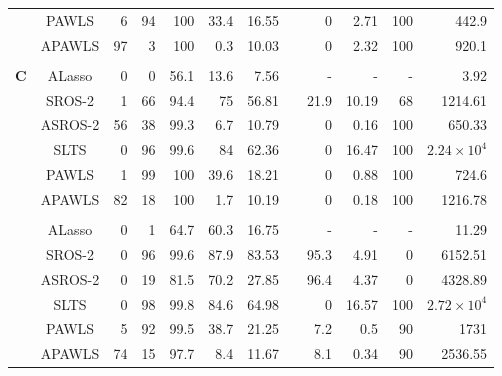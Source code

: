 \documentclass{article}\usepackage[]{graphicx}\usepackage[]{color}
\begin{document}
\begin{table}[thp]
\begin{center}
\begin{tabular}{ccrrrrrrrrrr}
	      & PAWLS & 6 & 94 & 100 
	      & 33.4 & 16.55 & & 0 
	      & 2.71 & 100 & 442.9\\
	      
	      & APAWLS & 97 & 3 & 100 
	      & 0.3 & 10.03 & & 0 
	      & 2.32 & 100 & 920.1\\
	      \\
	        	  \multirow{8}{*}{{\bf C}}
	     	      & ALasso & 0 & 0 & 56.1 
	      & 13.6 & 7.56 & & -& - & - &  3.92\\
	      
	       & SROS-2 & 1 & 66 & 94.4 
	      & 75 & 56.81 & & 21.9 
	      & 10.19 & 68 & 1214.61\\
	      
	      & ASROS-2 & 56 & 38 & 99.3 
	      & 6.7 & 10.79 & & 0 
	      & 0.16 & 100 & 650.33\\
	      
	      
	       & SLTS & 0 & 96 & 99.6 
	      & 84 & 62.36 & & 0 
	      & 16.47 & 100 & \ensuremath{2.24\times 10^{4}}\\
	      
	      & PAWLS & 1 & 99 & 100 
	      & 39.6 & 18.21 & & 0 
	      & 0.88 & 100 & 724.6\\
	      
	      & APAWLS & 82 & 18 & 100 
	      & 1.7 & 10.19 & & 0 
	      & 0.18 & 100 & 1216.78\\
	      
	     \\
	       	  \multirow{8}{*}{{\bf D}}
	     	      & ALasso & 0 & 1 & 64.7 
	      & 60.3 & 16.75 & & -& - & - &  11.29\\
	      
	       & SROS-2 & 0 & 96 & 99.6 
	      & 87.9 & 83.53 & & 95.3 
	      & 4.91 & 0 & 6152.51\\
	      
	      & ASROS-2 & 0 & 19 & 81.5 
	      & 70.2 & 27.85 & & 96.4 
	      & 4.37 & 0 & 4328.89\\
	      
	      
	       & SLTS & 0 & 98 & 99.8 
	      & 84.6 & 64.98 & & 0 
	      & 16.57 & 100 & \ensuremath{2.72\times 10^{4}}\\
	      
	      & PAWLS & 5 & 92 & 99.5 
	      & 38.7 & 21.25 & & 7.2 
	      & 0.5 & 90 & 1731\\
	      
	      & APAWLS & 74 & 15 & 97.7 
	      & 8.4 & 11.67 & & 8.1 
	      & 0.34 & 90 & 2536.55\\
	      

\end{tabular}
\end{center}
\end{table}
\end{document}

